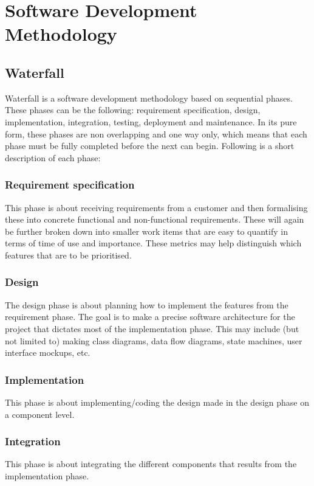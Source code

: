 \section{Software Development Methodology}

\subsection{Waterfall}
Waterfall is a software development methodology based on sequential phases.
These phases can be the following: requirement specification, design,
implementation, integration, testing, deployment and maintenance. In its pure
form, these phases are non overlapping and one way only, which means that each
phase must be fully completed before the next can begin. Following is a short
description of each phase:

\subsubsection{Requirement specification}
This phase is about receiving requirements from a customer and then formalising
these into concrete functional and non-functional requirements. These will
again be further broken down into smaller work items that are easy to quantify
in terms of time of use and importance. These metrics may help distinguish
which features that are to be prioritised.

\subsubsection{Design}
The design phase is about planning how to implement the features from the
requirement phase. The goal is to make a precise software architecture for the
project that dictates most of the implementation phase. This may include (but
not limited to) making class diagrams, data flow diagrams, state machines, user
interface mockups, etc.

\subsubsection{Implementation}
This phase is about implementing/coding the design made in the design phase on
a component level.

\subsubsection{Integration}
This phase is about integrating the different components that results from the
implementation phase.

